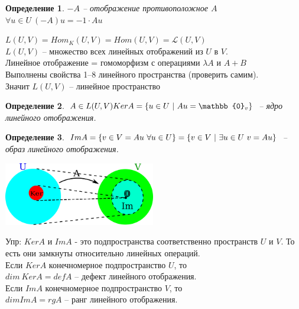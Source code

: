 \documentclass[12pt]{article}
\newtheorem{defin}{Определение}
\theoremstyle{remark}
\theoremstyle{definition}
\newcommand{\0}{\mathbb{0}}
\newcommand{\mybox}{
	\collectbox{
		\setlength{\fboxsep}{1pt}
		\fbox{\BOXCONTENT}
	}
}
\begin{document}
	\begin{defin}
		$-A$ -- отображение противоположное $A$\\
		$\forall u \in U \ (-A)u = -1 \cdot Au$
	\end{defin}
	
	$L(U, V) = Hom_K(U, V) = Hom(U, V) = \mathcal{L}(U, V)$\\
	$L(U, V)$ -- множество всех линейных отображений из $U$ в $V$.\\
	Линейное отображение = гомоморфизм с операциями $\lambda A$ и $A + B$\\
	Выполнены свойства 1--8 линейного пространства (проверить самим). \\Значит \mybox{$L(U, V)$ -- линейное пространство}
	\begin{defin}
	$A \in L(U, V)\\
	KerA = \{u \in U \ | \ Au = \0_v\}$ -- ядро линейного отображения. 
	\end{defin}
	\begin{defin}
		$ImA =\{v \in V = Au \ \forall u \in U\} = \\ \{v \in V \ | \  \exists u \in U \ v = Au\}$ --
	образ линейного отображения.
	\end{defin}
	\includegraphics[width=250px]{1}
	
	Упр: $KerA$ и $ImA$ - это подпространства соответственно пространств $U$ и $V$. То есть они замкнуты относительно линейных операций. \\
	Если $KerA$ конечномерное подпространство $U$, то \\
	\mybox{$dim \ KerA = defA$} -- дефект линейного отображения.\\
	Если $ImA$ конечномерное подпространство $V$, то \\
	\mybox{$dimImA = rgA$} -- ранг линейного отображения.
	
\end{document}
